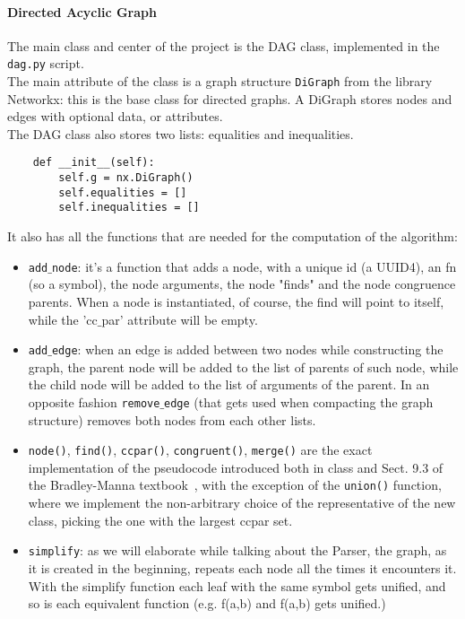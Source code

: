 \documentclass[11pt]{article}
\begin{document}
\paragraph{Directed Acyclic Graph}
    The main class and center of the project is the DAG class, implemented in the \texttt{dag.py} script.\\
    The main attribute of the class is a graph structure \texttt{DiGraph} from the library Networkx: this is the base class for directed graphs. A DiGraph stores nodes and edges with optional data, or attributes.\\
    The DAG class also stores two lists: equalities and inequalities.
    \begin{lstlisting}
    def __init__(self): 
        self.g = nx.DiGraph()
        self.equalities = []
        self.inequalities = []
    \end{lstlisting}
    It also has all the functions that are needed for the computation of the algorithm:
        \begin{itemize}
            \item \texttt{add$\_$node}: it's a function that adds a node, with a unique id (a UUID4), an fn (so a symbol), the node arguments, the node "finds" and the node congruence parents. When a node is instantiated, of course, the find will point to itself, while the 'cc$\_$par' attribute will be empty.
            \item \texttt{add$\_$edge}: when an edge is added between two nodes while constructing the graph, the parent node will be added to the list of parents of such node, while the child node will be added to the list of arguments of the parent. In an opposite fashion \texttt{remove$\_$edge} (that gets used when compacting the graph structure) removes both nodes from each other lists.
            \item \texttt{node()}, \texttt{find()}, \texttt{ccpar()}, \texttt{congruent()}, \texttt{merge()} are the exact implementation of the pseudocode introduced both in class and Sect. 9.3 of the Bradley-Manna textbook~\cite{manna}, with the exception of the \texttt{union()} function, where we implement the non-arbitrary choice of the representative of the new class, picking the one with the largest ccpar set.
            
            \item \texttt{simplify}: as we will elaborate while talking about the Parser, the graph, as it is created in the beginning, repeats each node all the times it encounters it. With the simplify function each leaf with the same symbol gets unified, and so is each equivalent function (e.g. f(a,b) and f(a,b) gets unified.) 
        \end{itemize}
\end{document}
